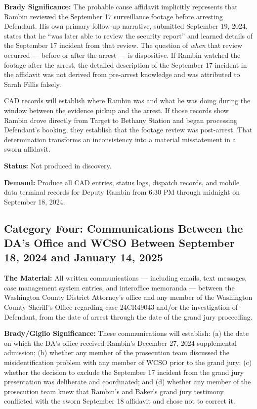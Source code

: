 \documentclass[12pt,letterpaper]{extarticle}
\begin{document}
\textbf{Brady Significance:} The probable cause affidavit implicitly represents
that Rambin reviewed the September 17 surveillance footage before arresting
Defendant. His own primary follow-up narrative, submitted September 19, 2024,
states that he ``was later able to review the security report'' and learned details
of the September 17 incident from that review. The question of \textit{when} that
review occurred --- before or after the arrest --- is dispositive. If Rambin
watched the footage after the arrest, the detailed description of the September 17
incident in the affidavit was not derived from pre-arrest knowledge and was
attributed to Sarah Fillis falsely.

CAD records will establish where Rambin was and what he was doing during the
window between the evidence pickup and the arrest. If those records show Rambin
drove directly from Target to Bethany Station and began processing Defendant's
booking, they establish that the footage review was post-arrest. That determination
transforms an inconsistency into a material misstatement in a sworn affidavit.

\textbf{Status:} Not produced in discovery.

\textbf{Demand:} Produce all CAD entries, status logs, dispatch records, and
mobile data terminal records for Deputy Rambin from 6:30 PM through midnight on
September 18, 2024.

\subsection{Category Four: Communications Between the DA's Office and WCSO
Between September 18, 2024 and January 14, 2025}

\textbf{The Material:} All written communications --- including emails, text
messages, case management system entries, and interoffice memoranda --- between
the Washington County District Attorney's office and any member of the Washington
County Sheriff's Office regarding case 24CR49043 and/or the investigation of
Defendant, from the date of arrest through the date of the grand jury proceeding.

\textbf{Brady/Giglio Significance:} These communications will establish: (a) the
date on which the DA's office received Rambin's December 27, 2024 supplemental
admission; (b) whether any member of the prosecution team discussed the
misidentification problem with any member of WCSO prior to the grand jury; (c)
whether the decision to exclude the September 17 incident from the grand jury
presentation was deliberate and coordinated; and (d) whether any member of the
prosecution team knew that Rambin's and Baker's grand jury testimony conflicted
with the sworn September 18 affidavit and chose not to correct it.
\end{document}
